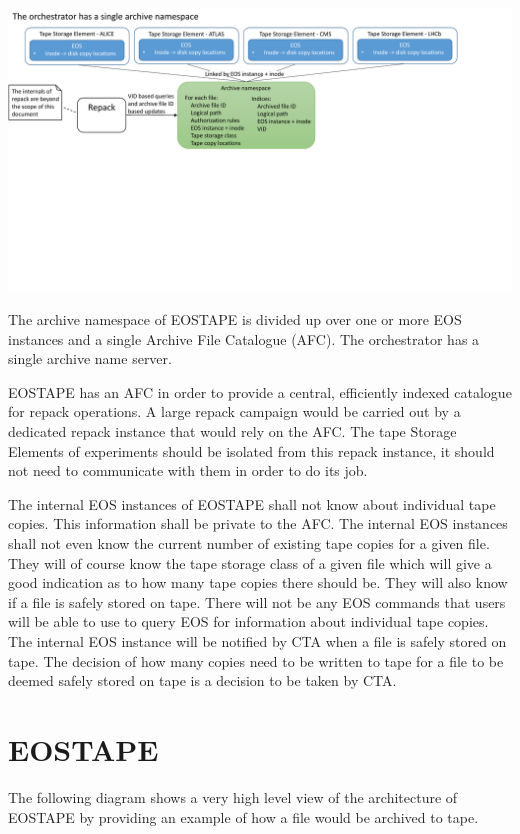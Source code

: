 \documentclass{article}
\begin{document}
\includegraphics[width=\linewidth, trim=0mm 90mm 35mm 0mm]{Orchestrator_namespaces}

The archive namespace of EOSTAPE is divided up over one or more EOS instances and a single Archive File Catalogue (AFC).  The orchestrator has a single archive name server.

EOSTAPE has an AFC in order to provide a central, efficiently indexed catalogue for repack operations.  A large repack campaign would be carried out by a dedicated repack instance that would rely on the AFC.  The tape Storage Elements of experiments should be isolated from this repack instance, it should not need to communicate with them in order to do its job.

The internal EOS instances of EOSTAPE shall not know about individual tape copies.  This information shall be private to the AFC.  The internal EOS instances shall not even know the current number of existing tape copies for a given file.  They will of course know the tape storage class of a given file which will give a good indication as to how many tape copies there should be.  They will also know if a file is safely stored on tape.  There will not be any EOS commands that users will be able to use to query EOS for information about individual tape copies.  The internal EOS instance will be notified by CTA when a file is safely stored on tape.  The decision of how many copies need to be written to tape for a file to be deemed safely stored on tape is a decision to be taken by CTA.

\newpage
\section{EOSTAPE}
The following diagram shows a very high level view of the architecture of EOSTAPE by providing an example of how a file would be archived to tape.
\end{document}
